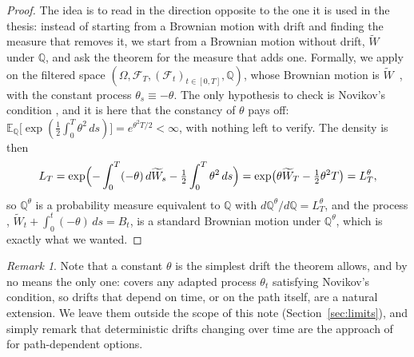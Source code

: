 \documentclass[11pt,a4paper]{article}
\theoremstyle{plain}
\theoremstyle{definition}
\theoremstyle{remark}
\newtheorem{remark}[theorem]{Remark}
\newcommand{\E}{\mathbb{E}}
\newcommand{\Q}{\mathbb{Q}}
\newcommand{\F}{\mathcal{F}}
\newcommand{\1}{\mathbf{1}}
\newcommand{\Wt}{\widetilde{W}}
\newcommand{\Qt}{\Q^{\theta}}
\begin{document}
\begin{proof}
The idea is to read \cite[Thm~4.20]{tfg} in the direction opposite to the one it is used in the thesis: instead of starting from a Brownian motion with drift and finding the measure that removes it, we start from a Brownian motion without drift, $\Wt$ under $\Q$, and ask the theorem for the measure that adds one. Formally, we apply \cite[Thm~4.20]{tfg} on the filtered space $(\Omega, \F_T, (\F_t)_{t \in [0,T]}, \Q)$, whose Brownian motion is $\Wt$~\cite[(5.13)]{tfg}, with the constant process $\theta_s \equiv -\theta$. The only hypothesis to check is Novikov's condition \cite[(4.28)]{tfg}, and it is here that the constancy of $\theta$ pays off: $\E_\Q\bigl[\exp(\tfrac12 \int_0^T \theta^2\, ds)\bigr] = e^{\theta^2 T/2} < \infty$, with nothing left to verify. The density \cite[(4.27)]{tfg} is then
\[
  L_T = \exp\Bigl(-\int_0^T (-\theta)\, d\Wt_s - \tfrac12 \int_0^T \theta^2\, ds\Bigr)
      = \exp\bigl(\theta \Wt_T - \tfrac12 \theta^2 T\bigr) = L^\theta_T ,
\]
so $\Qt$ is a probability measure equivalent to $\Q$ with $d\Qt/d\Q = L^\theta_T$, and the process \cite[(4.29)]{tfg}, $\Wt_t + \int_0^t (-\theta)\, ds = B_t$, is a standard Brownian motion under $\Qt$, which is exactly what we wanted.
\end{proof}

\begin{remark}\label{rem:constant}
Note that a constant $\theta$ is the simplest drift the theorem allows, and by no means the only one: \cite[Thm~4.20]{tfg} covers any adapted process $\theta_t$ satisfying Novikov's condition, so drifts that depend on time, or on the path itself, are a natural extension. We leave them outside the scope of this note (Section~\ref{sec:limits}), and simply remark that deterministic drifts changing over time are the approach of \cite[\S 4.6.2]{glasserman} for path-dependent options.
\end{remark}
\end{document}
